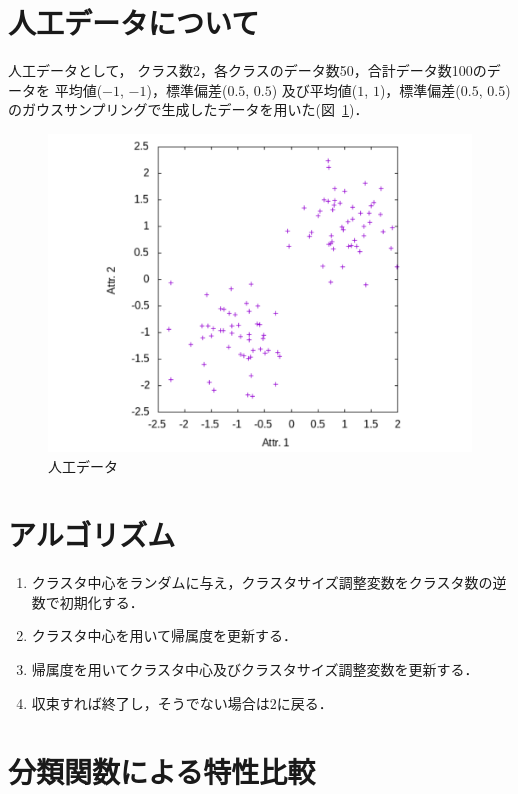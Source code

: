 \documentclass[a4j,12pt,dvipdfmx,oneside]{jsbook}
\theoremstyle{definition}
\begin{document}
 \section{人工データについて}\label{sec:about_artificial_data}
 人工データとして，
 クラス数2，各クラスのデータ数50，合計データ数100のデータを
 平均値($-1$, $-1$)，標準偏差($0.5$, $0.5$)
 及び平均値($1$, $1$)，標準偏差($0.5$, $0.5$)
 のガウスサンプリングで生成したデータを用いた(図~\ref{fig:artificial_data})．
 \begin{figure}[p]
  \centering
  \includegraphics[width=\linewidth]{2d-dat.pdf}
  \caption{人工データ}
  \label{fig:artificial_data}
 \end{figure}

 \section{アルゴリズム}\label{sec:suggest_algorythm}
  \begin{enumerate}
   \item クラスタ中心をランダムに与え，クラスタサイズ調整変数をクラスタ数の逆数で初期化する．
   \item クラスタ中心を用いて帰属度を更新する．
   \item 帰属度を用いてクラスタ中心及びクラスタサイズ調整変数を更新する．
   \item 収束すれば終了し，そうでない場合は$2$に戻る．
  \end{enumerate}

  \section{分類関数による特性比較}\label{sec:classification_function}
\end{document}
